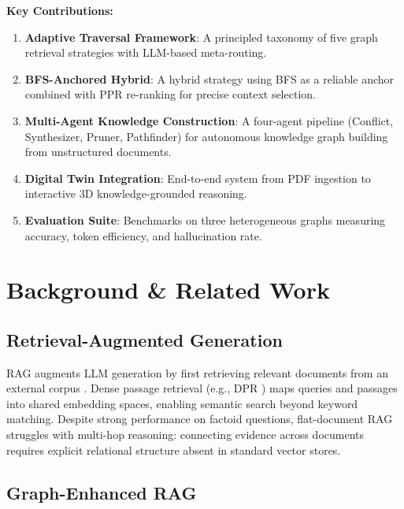 \documentclass[12pt,a4paper]{article}
\begin{document}
\begin{keycontrib}
\textbf{Key Contributions:}
\begin{enumerate}[label=\textcolor{highlight}{\faCheckCircle}, leftmargin=*]
  \item \textbf{Adaptive Traversal Framework}: A principled taxonomy of five
    graph retrieval strategies with LLM-based meta-routing.
  \item \textbf{BFS-Anchored Hybrid}: A hybrid strategy using BFS as a reliable
    anchor combined with PPR re-ranking for precise context selection.
  \item \textbf{Multi-Agent Knowledge Construction}: A four-agent pipeline
    (Conflict, Synthesizer, Pruner, Pathfinder) for autonomous knowledge graph
    building from unstructured documents.
  \item \textbf{Digital Twin Integration}: End-to-end system from PDF ingestion
    to interactive 3D knowledge-grounded reasoning.
  \item \textbf{Evaluation Suite}: Benchmarks on three heterogeneous graphs
    measuring accuracy, token efficiency, and hallucination rate.
\end{enumerate}
\end{keycontrib}

\section{Background \& Related Work}

\subsection{Retrieval-Augmented Generation}

RAG augments LLM generation by first retrieving relevant documents from an
external corpus \cite{lewis2020rag}. Dense passage retrieval
(e.g., DPR \cite{karpukhin2020dpr}) maps queries and passages into shared
embedding spaces, enabling semantic search beyond keyword matching. Despite
strong performance on factoid questions, flat-document RAG struggles with
multi-hop reasoning: connecting evidence across documents requires explicit
relational structure absent in standard vector stores.

\subsection{Graph-Enhanced RAG}
\end{document}
